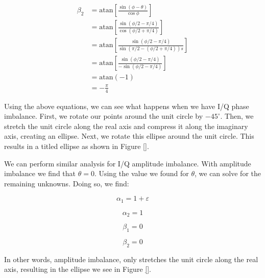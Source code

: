 \documentclass{article}
\begin{document}
\begin{align}
	\beta_2 &= \text{atan}\left[\frac{\sin(\phi-\theta)}{\cos\phi}\right] \\
	&= \text{atan}\left[\frac{\sin(\phi/2-\pi/4)}{\cos(\phi/2+\pi/4)}\right] \\
	&= \text{atan}\left[\frac{\sin(\phi/2-\pi/4)}{\sin(\pi/2-(\phi/2+\pi/4))s}\right] \\
	&= \text{atan}\left[\frac{\sin(\phi/2-\pi/4)}{-\sin(\phi/2-\pi/4)}\right] \\
	&= \text{atan}(-1) \\
	&= -\frac{\pi}{4}
\end{align}

Using the above equations, we can see what happens when we have I/Q phase imbalance. First, we rotate our points around the unit circle by $-45^{\circ}$. Then, we stretch the unit circle along the real axis and compress it along the imaginary axis, creating an ellipse. Next, we rotate this ellipse around the unit circle. This results in a titled ellipse as shown in Figure \ref{}.

We can perform similar analysis for I/Q amplitude imbalance. With amplitude imbalance we find that $\theta = 0$. Using the value we found for $\theta$, we can solve for the remaining unknowns. Doing so, we find:

\begin{equation}
	\alpha_1 = 1 + \varepsilon
\end{equation}

\begin{equation}
	\alpha_2 = 1
\end{equation}

\begin{equation}
	\beta_1 = 0
\end{equation}

\begin{equation}
	\beta_2 = 0
\end{equation}

In other words, amplitude imbalance, only stretches the unit circle along the real axis, resulting in the ellipse we see in Figure \ref{}.
\end{document}
